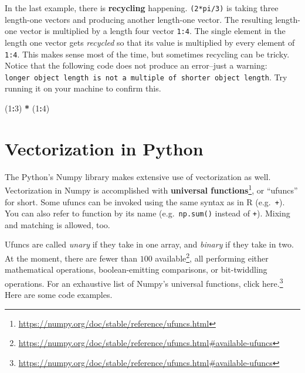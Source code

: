 \documentclass[12pt,krantz2]{krantz}
\makeatletter
\newenvironment{Shaded}{\begin{snugshade}}{\end{snugshade}}
\newcommand{\DecValTok}[1]{\textcolor[rgb]{0.06,0.06,0.06}{#1}}
\newcommand{\NormalTok}[1]{#1}
\newcommand{\OperatorTok}[1]{\textcolor[rgb]{0.43,0.43,0.43}{\textbf{#1}}}
\newcommand{\StringTok}[1]{\textcolor[rgb]{0.5,0.5,0.5}{#1}}
\renewcommand{\href}[2]{#2\footnote{\url{#1}}}
\newenvironment{kframe}{%
\medskip{}
\setlength{\fboxsep}{.8em}
 \def\at@end@of@kframe{}%
 \ifinner\ifhmode%
  \def\at@end@of@kframe{\end{minipage}}%
  \begin{minipage}{\columnwidth}%
 \fi\fi%
 \def\FrameCommand##1{\hskip\@totalleftmargin \hskip-\fboxsep
 \colorbox{shadecolor}{##1}\hskip-\fboxsep
     \hskip-\linewidth \hskip-\@totalleftmargin \hskip\columnwidth}%
 \MakeFramed {\advance\hsize-\width
   \@totalleftmargin\z@ \linewidth\hsize
   \@setminipage}}%
 {\par\unskip\endMakeFramed%
 \at@end@of@kframe}
\renewenvironment{Shaded}{\begin{kframe}}{\end{kframe}}
\makeatother
\begin{document}
In the last example, there is \textbf{recycling} happening. \texttt{(2*pi/3)} is taking three length-one vectors and producing another length-one vector. The resulting length-one vector is multiplied by a length four vector \texttt{1:4}. The single element in the length one vector gets \emph{recycled} so that its value is multiplied by every element of \texttt{1:4}.
This makes sense most of the time, but sometimes recycling can be tricky. Notice that the following code does not produce an error--just a warning: \texttt{longer\ object\ length\ is\ not\ a\ multiple\ of\ shorter\ object\ length}. Try running it on your machine to confirm this.

\begin{Shaded}
\begin{Highlighting}[]
\NormalTok{(}\DecValTok{1}\OperatorTok{:}\DecValTok{3}\NormalTok{) }\OperatorTok{*}\StringTok{ }\NormalTok{(}\DecValTok{1}\OperatorTok{:}\DecValTok{4}\NormalTok{)}
\end{Highlighting}
\end{Shaded}

\hypertarget{vectorization-in-python}{%
\section{Vectorization in Python}\label{vectorization-in-python}}

The Python's Numpy library makes extensive use of vectorization as well. Vectorization in Numpy is accomplished with \href{https://numpy.org/doc/stable/reference/ufuncs.html}{\textbf{universal functions}}, or ``ufuncs'' for short. Some ufuncs can be invoked using the same syntax as in R (e.g.~\texttt{+}). You can also refer to function by its name (e.g.~\texttt{np.sum()} instead of \texttt{+}). Mixing and matching is allowed, too.

Ufuncs are called \emph{unary} if they take in one array, and \emph{binary} if they take in two. At the moment, there are \href{https://numpy.org/doc/stable/reference/ufuncs.html\#available-ufuncs}{fewer than \(100\) available}, all performing either mathematical operations, boolean-emitting comparisons, or bit-twiddling operations. For an exhaustive list of Numpy's universal functions, \href{https://numpy.org/doc/stable/reference/ufuncs.html\#available-ufuncs}{click here.} Here are some code examples.
\end{document}
